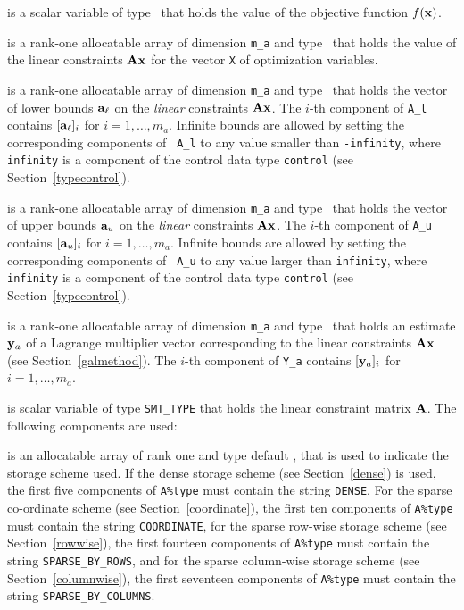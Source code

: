 \documentclass{galahad}
\begin{document}
\begin{description}

 is a scalar variable of type 
\realdp\ that holds the value of the objective function $f({\mathbf{x}})$.

 is a rank-one allocatable array of dimension {\tt m\_a}
and type \realdp\ that holds the value of the linear
constraints ${\mathbf{A}}{\mathbf{x}}$ for the vector {\tt X} of optimization variables.   

 is a rank-one allocatable array of dimension {\tt m\_a}
and type \realdp\ that holds the vector of lower bounds
${\mathbf{a}}_\ell$ on the {\em linear} constraints ${\mathbf{A}}{\mathbf{x}}$. The $i$-th component of
{\tt A\_l} contains $[{\mathbf{a}}_\ell]_i$ for $i = 1, \ldots , m_a$.  Infinite
bounds are allowed by setting the corresponding components of {\tt
  A\_l} to any value smaller than {\tt -infinity}, where {\tt
  infinity} is a component of the control data type {\tt control} (see
Section~\ref{typecontrol}).

  is a rank-one allocatable array of dimension {\tt m\_a}
and type \realdp\ that holds the vector of upper bounds
${\mathbf{a}}_u$ on the {\em linear} constraints ${\mathbf{A}}{\mathbf{x}}$. The $i$-th component of
{\tt A\_u} contains $[{\mathbf{a}}_u]_i$ for $i = 1, \ldots , m_a$.  Infinite
bounds are allowed by setting the corresponding components of {\tt
  A\_u} to any value larger than {\tt infinity}, where {\tt
  infinity} is a component of the control data type {\tt control} (see
Section~\ref{typecontrol}).

 is a rank-one allocatable array of dimension {\tt m\_a} and type 
\realdp\ that holds an estimate ${\mathbf{y}}_a$ of a Lagrange
multiplier vector corresponding to the linear constraints ${\mathbf{A}}{\mathbf{x}}$ (see Section~\ref{galmethod}).
The $i$-th component of {\tt Y\_a} contains $[{\mathbf{y}}_a]_{i}$ for $i = 1,
\ldots , m_a$.


 is scalar variable of type {\tt SMT\_TYPE} 
that holds the linear constraint matrix ${\mathbf{A}}$. The following components
are used:

\begin{description}

 is an allocatable array of rank one and type default 
\character, that
is used to indicate the storage scheme used. If the dense storage scheme 
(see Section~\ref{dense}) is used, 
the first five components of {\tt A\%type} must contain the
string {\tt DENSE}.
For the sparse co-ordinate scheme (see Section~\ref{coordinate}), 
the first ten components of {\tt A\%type} must contain the
string {\tt COORDINATE},  
for the sparse row-wise storage scheme (see Section~\ref{rowwise}),
the first fourteen components of {\tt A\%type} must contain the
string {\tt SPARSE\_BY\_ROWS},
and for the sparse column-wise storage scheme (see Section~\ref{columnwise}),
the first seventeen components of {\tt A\%type} must contain the
string {\tt SPARSE\_BY\_COLUMNS}.


\end{description}
\end{description}
\end{document}
